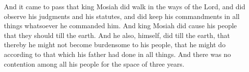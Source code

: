 And it came to pass that king Mosiah did walk in the ways of the Lord, and did observe his judgments and his statutes, and did keep his commandments in all things whatsoever he commanded him.
\bverse \iffalse And king Mosiah did cause his people that they should till the earth. And he also, himself, did till the earth, that thereby he might not become burdensome to his people, that he might do according to that which his father had done in all things. And there was no contention among all his people for the space of three years. \fi
And king Mosiah did cause his people that they should till the earth. And he also, himself, did till the earth, that thereby he might not become burdensome to his people, that he might do according to that which his father had done in all things. And there was no contention among all his people for the space of three years.

